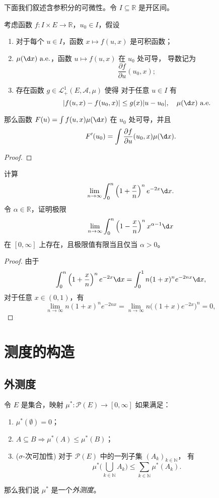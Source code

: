 \documentclass[fontset=none]{Notes}
\newcommand{\alev}[1]{\text{$#1$ a.e.}}
\begin{document}
下面我们叙述含参积分的可微性。令 $I\subseteq \mathbb{R}$ 是开区间。

\begin{theorem}
  考虑函数 $f:I\times E\to \mathbb{R}$，$u_0\in I$，假设
  \begin{enumerate}
    \item 对于每个 $u\in I$，函数 $x\mapsto f(u,x)$ 是可积函数；
    \item $\alev{\mu(\d x)}$，函数 $u\mapsto f(u,x)$ 在 $u_0$ 处可导，
    导数记为
    \[
      \frac{\partial f}{\partial u}(u_0,x);  
    \]
    \item 存在函数 $g\in \mathcal{L}_+^1(E,\mathcal{A},\mu)$ 使得
    对于任意 $u\in I$ 有
    \[
      |f(u,x)-f(u_0,x)|\leq g(x)|u-u_0|,\quad \alev{\mu(\d x)}  
    \]
  \end{enumerate}
  那么函数 $F(u)=\int f(u,x)\mu(\d x)$ 在 $u_0$ 处可导，并且
  \[
    F'(u_0)=\int \frac{\partial f}{\partial u}(u_0,x)\mu(\d x).
  \]
\end{theorem}
\begin{proof}
  
\end{proof}


\begin{exercise}
  计算
  \[
    \lim_{n\to\infty}\int_0^n\left(1+\frac{x}{n}\right)^ne^{-2x}\d x.  
  \]
  令 $\alpha\in \mathbb{R}$，证明极限
  \[
    \lim_{n\to\infty}\int_0^n\left(1-\frac{x}{n}\right)^n x^{\alpha-1}\d x  
  \]
  在 $[0,\infty]$ 上存在，且极限值有限当且仅当 $\alpha>0$。
\end{exercise}
\begin{proof}
  由于
  \[
    \int_0^n\left(1+\frac{x}{n}\right)^ne^{-2x}\d x=\int_0^1
    n(1+x)^ne^{-2nx}\d x,
  \]
  对于任意 $x\in (0,1)$，有
  \[
    \lim_{n\to\infty}n(1+x)^n e^{-2nx}=\lim_{n\to\infty}n\bigl((1+x)e^{-2x}\bigr) ^n
    =0,
  \]
\end{proof}



\chapter{测度的构造}

\section{外测度}

\begin{definition}
  令 $E$ 是集合，映射 $\mu^*:\mathcal{P}(E)\to [0,\infty]$ 如果满足：
  \begin{enumerate}
    \item  $\mu^*(\emptyset)=0$；
    \item $A\subseteq B\Rightarrow \mu^*(A)\leq\mu^*(B)$；
    \item ($\sigma$-次可加性) 对于 $\mathcal{P}(E)$ 中的一列子集 $(A_k)_{k\in \mathbb{N}}$，
    有
    \[
      \mu^*\biggl(\bigcup_{k\in \mathbb{N}}A_k \biggr)  \leq
      \sum_{k\in \mathbb{N}}\mu^*(A_k).
    \]
  \end{enumerate}
  那么我们说 $\mu^*$ 是一个\emph{外测度}。
\end{definition}
\end{document}
